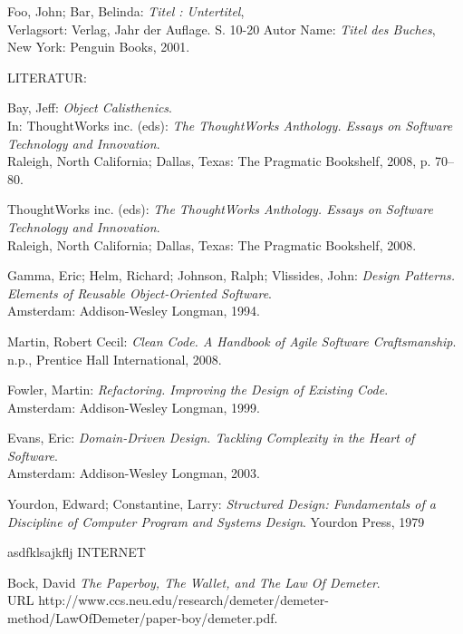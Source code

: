 \documentclass[12pt,a4paper,oneside, 
liststotoc, 					%
bibtotoc,						%
titlepage, 						%
headsepline, 					%
BCOR6mm,						%
english
]{scrreprt}
\begin{document}
\begin{thebibliography}{999999}

 Foo, John; Bar, Belinda: \emph{Titel : Untertitel},\\ Verlagsort: Verlag, Jahr der Auflage. S. 10-20
 Autor Name: \emph{Titel des Buches}, New York: Penguin Books, 2001.

LITERATUR: 

 Bay, Jeff: 
\emph{Object Calisthenics}. \\ In: ThoughtWorks inc. (eds): 
\emph{The ThoughtWorks Anthology. Essays on Software Technology and Innovation}. \\ Raleigh, North California; Dallas, Texas: The Pragmatic Bookshelf, 2008, p. 70--80.

 ThoughtWorks inc. (eds): 
\emph{The ThoughtWorks Anthology. Essays on Software Technology and Innovation}. \\ Raleigh, North California; Dallas, Texas: The Pragmatic Bookshelf, 2008.

 Gamma, Eric; Helm, Richard; Johnson, Ralph; Vlissides,  John:
\emph{Design Patterns. Elements of Reusable Object-Oriented Software}. \\ Amsterdam: Addison-Wesley Longman, 1994.
  
 Martin, Robert Cecil:
\emph{Clean Code. A Handbook of Agile Software Craftsmanship}. \\ n.p., Prentice Hall International, 2008.

 Fowler, Martin:
\emph{Refactoring. Improving the Design of Existing Code}. \\ Amsterdam: Addison-Wesley Longman, 1999. 

 Evans, Eric:
\emph{Domain-Driven Design. Tackling Complexity in the Heart of Software}. \\ Amsterdam: Addison-Wesley Longman, 2003. 

 Yourdon, Edward; Constantine, Larry:
\emph{Structured Design: Fundamentals of a Discipline of Computer Program and Systems Design}. Yourdon Press, 1979

asdfklsajkflj INTERNET

 Bock, David
\emph{The Paperboy, The Wallet, and The Law Of Demeter}. \\ URL http://www.ccs.neu.edu/research/demeter/demeter-method/LawOfDemeter/paper-boy/demeter.pdf.


\end{thebibliography}
\end{document}
